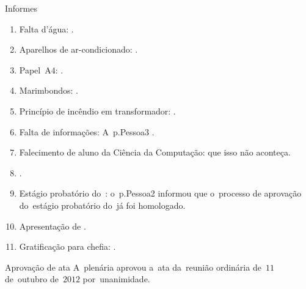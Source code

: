 \documentclass[12pt,a4paper]{ata}
\begin{document}
\begin{ponto}{Informes}

  \begin{enumerate}

  \item Falta d'água: \dummyText.

  \item Aparelhos de ar-condicionado: \dummyText.

  \item Papel~A$4$: \dummyText.

  \item Marimbondos: \dummyText.

  \item Princípio de incêndio em transformador: \dummyText.

  \item Falta de informações: A~\profa \gls{p.Pessoa3} \dummyText.

  \item Falecimento de aluno da Ciência da Computação: que isso não aconteça.

  \item \dummyText. 

  \item Estágio probatório do~\prof: o~\prof \gls{p.Pessoa2} informou que o~processo de aprovação do~estágio probatório do~\prof já foi homologado.

  \item Apresentação de \dummyText.

  \item Gratificação para chefia: \dummyText.

  \end{enumerate}

\end{ponto}

\label{Aprovação em ata}
\begin{ponto}{Aprovação de ata}
  A~plenária aprovou a~ata da~reunião ordinária de~$11$ de~outubro
  de~$2012$ por~unanimidade.
\end{ponto}
\end{document}
